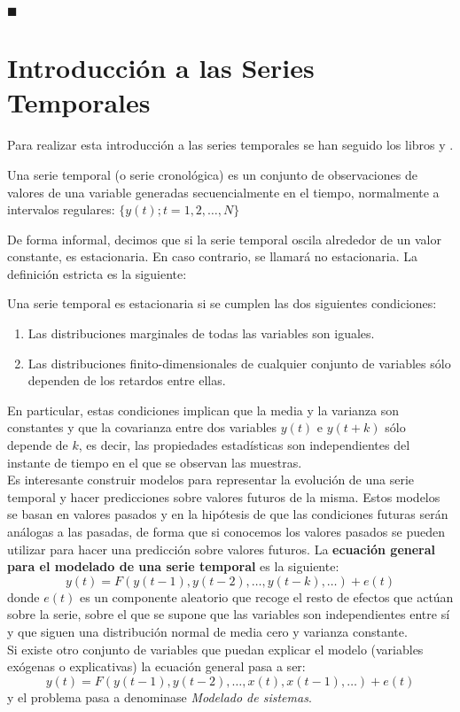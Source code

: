 \begin{flushright}
$\blacksquare$
\end{flushright}

\newpage

\section{Introducción a las Series Temporales}

Para realizar esta introducción a las series temporales se han seguido los libros \cite{pena05} y \cite{box08}.\\

\begin{definicion}
Una serie temporal (o serie cronológica) es un conjunto de observaciones de valores de una variable generadas secuencialmente en el tiempo, normalmente a intervalos regulares: $\{y(t); t=1,2,\dots, N\}$
\end{definicion}

De forma informal, decimos que si la serie temporal oscila alrededor de un valor constante, es estacionaria. En caso contrario, se llamará no estacionaria. La definición estricta es la siguiente:
\begin{definicion}
Una serie temporal es estacionaria si se cumplen las dos siguientes condiciones:
\begin{enumerate}
\item Las distribuciones marginales de todas las variables son iguales.
\item Las distribuciones finito-dimensionales de cualquier conjunto de variables sólo dependen de los retardos entre ellas.
\end{enumerate}
\end{definicion}
En particular, estas condiciones implican que la media y la varianza son constantes y que la covarianza entre dos variables $y(t)$ e $y(t+k)$ sólo depende de $k$, es decir, las propiedades estadísticas son independientes del instante de tiempo en el que se observan las muestras.\\


Es interesante construir modelos para representar la evolución de una serie temporal y hacer predicciones sobre valores futuros de la misma. Estos modelos se basan en valores pasados y en la hipótesis de que las condiciones futuras serán análogas a las pasadas, de forma que si conocemos los valores pasados se pueden utilizar para hacer una predicción sobre valores futuros. La \textbf{ecuación general para el modelado de una serie temporal} es la siguiente:
\[	y(t) = F(y(t-1), y(t-2), \dots, y(t-k), \dots) + e(t)	\]
donde $e(t)$ es un componente aleatorio que recoge el resto de efectos que actúan sobre la serie, sobre el que se supone que las variables son independientes entre sí y que siguen una distribución normal de media cero y varianza constante.\\
Si existe otro conjunto de variables que puedan explicar el modelo (variables exógenas o explicativas) la ecuación general pasa a ser:
\[	y(t) = F(y(t-1), y(t-2), \dots, x(t), x(t-1), \dots) + e(t)	\]
y el problema pasa a denominase \textit{Modelado de sistemas}.\\

